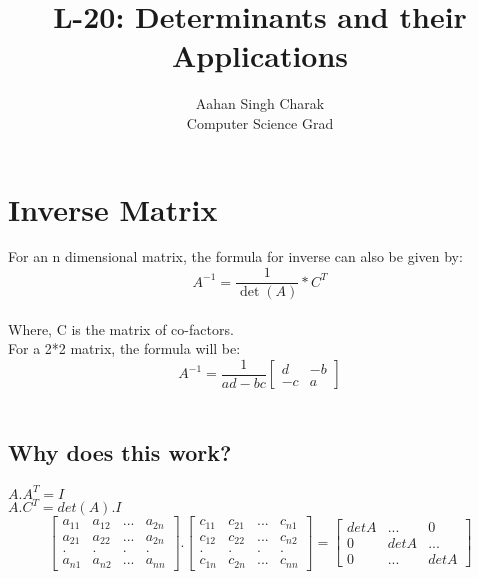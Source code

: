 \documentclass[]{article}
\title{L-20: Determinants and their Applications}
\author{Aahan Singh Charak\\Computer Science Grad}
\begin{document}
	\maketitle
	\section{Inverse Matrix}
	\vspace{10pt}
	
	For an n dimensional matrix, the formula for inverse can also be given by:\\
	
	\[
	A^{-1}=\frac{1}{\det(A)}*C^T
	\]\\
	
	\noindent
	Where, C is the matrix of co-factors.\\
	
	\noindent
	For a 2*2 matrix, the formula will be:\\
	
	\[
	A^{-1}=\frac{1}{ad-bc}\begin{bmatrix}
		d&-b\\
		-c&a
	\end{bmatrix}
	\]\\
	
	\vspace{10pt}
	
	\subsection{Why does this work?}
	\vspace{10pt}
	$A.A^T=I$\\
	
	\noindent
	$A.C^T=det(A).I$\\
	
	\[
\begin{bmatrix}
	a_{11}&a_{12}&...&a_{2n}\\
	a_{21}&a_{22}&...&a_{2n}\\
	.&.&.&.\\
	a_{n1}&a_{n2}&...&a_{nn}
\end{bmatrix}.\begin{bmatrix}
c_{11}&c_{21}&...&c_{n1}\\
c_{12}&c_{22}&...&c_{n2}\\
.&.&.&.\\
c_{1n}&c_{2n}&...&c_{nn}
\end{bmatrix}=\begin{bmatrix}
detA&...&0\\
0&detA&...\\
0&...&detA
\end{bmatrix}
	\]\\
	
\end{document}
